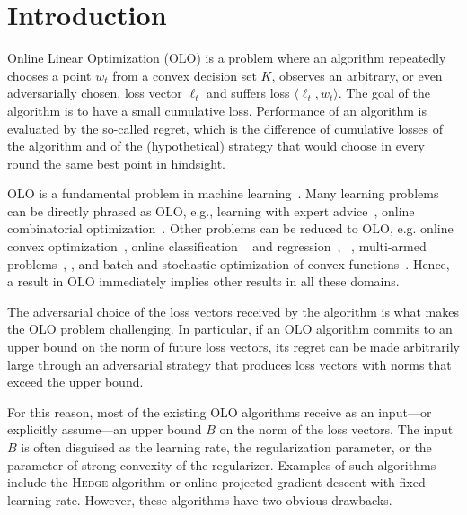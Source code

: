 \section{Introduction}
\label{section:introduction}

Online Linear Optimization (OLO) is a problem where an algorithm repeatedly
chooses a point $w_t$ from a convex decision set $K$, observes an arbitrary, or
even adversarially chosen, loss vector $\ell_t$ and suffers loss $\langle
\ell_t, w_t \rangle$.  The goal of the algorithm is to have a small cumulative
loss. Performance of an algorithm is evaluated by the so-called regret, which
is the difference of cumulative losses of the algorithm and of the
(hypothetical) strategy that would choose in every round the same best point in
hindsight.

OLO is a fundamental problem in machine
learning~\cite{Cesa-Bianchi-Lugosi-2006, Rakhlin-Sridharan-2009,
Shalev-Shwartz-2011}.  Many learning problems can be directly phrased as OLO,
e.g., learning with expert advice~\cite{Littlestone-Warmuth-1994, Vovk-1998,
Freund-Schapire-1997, Cesa-Bianchi-Haussler-Helmbold-Schapire-Warmuth-1997},
online combinatorial optimization~\cite{Kalai-Vempala-2005,
Helmbold-Warmuth-2009, Koolen-Warmuth-Kivinen-2010}. Other problems can be
reduced to OLO, e.g. online convex
optimization~\cite[Chapter~2]{Shalev-Shwartz-2011}, online classification
~\cite{Rosenblatt-1958,Freund-Schapire-1999} and
regression~\cite{Kivinen-Warmuth-1997},
~\cite[Chapters~11~and~12]{Cesa-Bianchi-Lugosi-2006}, multi-armed
problems~\cite[Chapter~6]{Cesa-Bianchi-Lugosi-2006},
\cite{Bubeck-Cesa-Bianchi-2012}, and batch and stochastic optimization of
convex functions~\cite{Nemirovski-Yudin-1983, Bubeck-2015}.  Hence, a result in
OLO immediately implies other results in all these domains.

The adversarial choice of the loss vectors received by the algorithm is what
makes the OLO problem challenging. In particular, if an OLO algorithm commits
to an upper bound on the norm of future loss vectors, its regret can be made
arbitrarily large through an adversarial strategy that produces loss vectors
with norms that exceed the upper bound.

For this reason, most of the existing OLO algorithms receive as an input---or
explicitly assume---an upper bound $B$ on the norm of the loss vectors.  The
input $B$ is often disguised as the learning rate, the regularization
parameter, or the parameter of strong convexity of the regularizer. Examples of
such algorithms include the \textsc{Hedge} algorithm or online projected gradient
descent with fixed learning rate.  However, these algorithms have two obvious
drawbacks.

